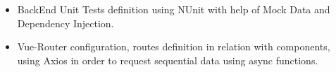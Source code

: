 \documentclass[letterpaper]{twentysecondcv} %
\begin{document}
\begin{twenty}
{\begin{itemize}
\begin{itemize}
                    \item BackEnd Unit Tests definition using NUnit with help of Mock Data and Dependency Injection.
                    
                    \item Vue-Router configuration, routes definition in relation with components, using Axios in order to request sequential data using async functions. %
                    

                    
                    

                \end{itemize}
            \end{itemize}
        }

                    
                

\end{twenty}
\end{document}
